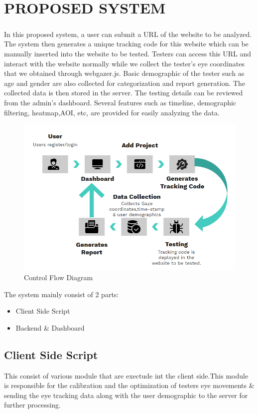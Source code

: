 \documentclass[12pt,a4paper,final]{extreport}
\begin{document}
\newpage
\chapter{PROPOSED SYSTEM}
\paragraph{}
In this proposed system, a user can submit a URL of the website to be analyzed. The system then generates a unique tracking code for this website which can be manually inserted into the website to be tested.
Testers can access this URL and interact with the website normally while we collect the tester's eye coordinates that we obtained through webgazer.js. Basic demographic of the tester such as age and gender are also collected for categorization and report generation. The collected data is then stored in the server. 
The testing details can be reviewed from the admin's dashboard. Several features such as timeline, demographic filtering, heatmap,AOI, etc, are provided for easily analyzing the data.
\begin{figure}[H]
    \centering
    \includegraphics[width=\linewidth]{proposed-method.png}
    \caption{Control Flow Diagram}
\end{figure}
The system mainly consist of 2 parts:
\begin{itemize}
	\item Client Side Script
	\item Backend \& Dashboard
\end{itemize}
\section{Client Side Script}
This consist of various module that are exectude int the client side.This module is responsible for the calibration and the optimization of testers eye movements \& sending the eye tracking data along with the user demographic to the server for further processing.
\end{document}
